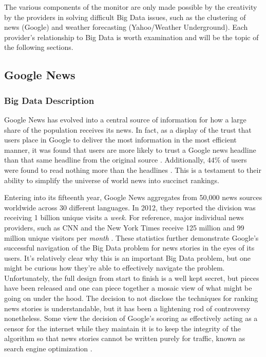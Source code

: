 \documentclass[sigconf]{acmart}
\begin{document}
The various components of the monitor are only made possible by the creativity by the providers in solving difficult Big Data issues, such as the  clustering of news (Google) and weather forecasting (Yahoo/Weather Underground). Each provider's relationship to Big Data is worth examination and will be the topic of the following sections. 

\subsection{Google News}
\subsubsection{Big Data Description}
Google News has evolved into a central source of information for how a large share of the population receives its news. In fact, as a display of the trust that users place in Google to deliver the most information in the most efficient manner, it was found that users are more likely to trust a Google news headline than that same headline from the original source \cite{edelman}. Additionally, $44\%$ of users were found to read nothing more than the headlines \cite{googleheadlines}. This is a testament to their ability to simplify the universe of world news into succinct rankings. 

Entering into its fifteenth year, Google News aggregates from 50,000 news sources worldwide across 30 different languages. In 2012, they reported the division was receiving 1 billion unique visits a \emph{week}\cite{krishna}. For reference, major individual news providers, such as CNN and the New York Times receive 125 million and 99 million unique visitors per \emph{month} \cite{nytimes}. These statistics further demonstrate Google's successful navigation of the Big Data problem for news stories in the eyes of its users. 
It's relatively clear why this is an important Big Data problem, but one might be curious how they're able to effectively navigate the problem. Unfortunately, the full design from start to finish is a well kept secret, but pieces have been released and one can piece together a mosaic view of what might be going on under the hood. The decision to not disclose the techniques for ranking news stories is understandable, but it has been a lightening rod of controversy nonetheless. Some view the decision of Google's scoring as effectively acting as a censor for the internet while they maintain it is to keep the integrity of the algorithm so that news stories cannot be written purely for traffic, known as search engine optimization \cite{censor}. 
\end{document}
